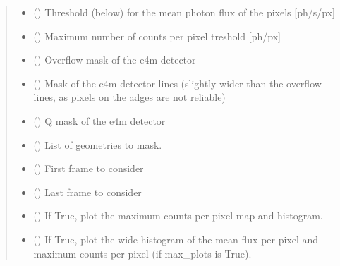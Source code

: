 \documentclass[letterpaper,10pt,english]{sphinxmanual}
\begin{document}
\begin{fulllineitems}
\begin{quote}
\begin{description}
\begin{itemize}
\item {} 
\sphinxAtStartPar
{} () \textendash{} Threshold (below) for the mean photon flux of the pixels {[}ph/s/px{]}

\item {} 
\sphinxAtStartPar
{} () \textendash{} Maximum number of counts per pixel treshold {[}ph/px{]}

\item {} 
\sphinxAtStartPar
{} () \textendash{} Overflow mask of the e4m detector

\item {} 
\sphinxAtStartPar
{} () \textendash{} Mask of the e4m detector lines (slightly wider than the overflow lines, as pixels on the adges are not reliable)

\item {} 
\sphinxAtStartPar
{} () \textendash{} Q mask of the e4m detector

\item {} 
\sphinxAtStartPar
{} () \textendash{} List of geometries to mask.

\item {} 
\sphinxAtStartPar
{} () \textendash{} First frame to consider

\item {} 
\sphinxAtStartPar
{} () \textendash{} Last frame to consider

\item {} 
\sphinxAtStartPar
{} () \textendash{} If True, plot the maximum counts per pixel map and histogram.

\item {} 
\sphinxAtStartPar
{} () \textendash{} If True, plot the wide histogram of the mean flux per pixel and maximum counts per pixel (if max\_plots is True).

\end{itemize}

\end{description}\end{quote}

\end{fulllineitems}
\end{document}
